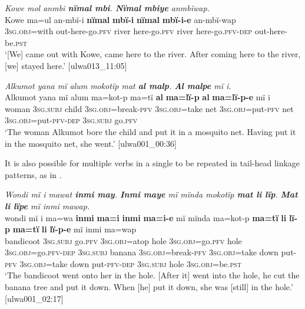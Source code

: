 \ea%
\label{ex:complex:69}
\textit{Kowe mol anmbi \textbf{nïmal mbi}. \textbf{Nïmal mbiye} anmbïwap.}\\
\gll    Kowe  ma=ul      an-mbï-i      \textbf{nïmal}  \textbf{mbï-i}      \textbf{nïmal}     \textbf{mbï-i-e}      an-mbï-wap\\
    [name]  3\textsc{sg.obj}=with  out-here-go.\textsc{pfv}  river  here-go.\textsc{pfv}  river    here-go.\textsc{pfv-dep}  out-here-be.\textsc{pst}\\
\glt `[We] came out with Kowe, came here to the river. After coming here to the river, [we] stayed here.’ [ulwa013\_11:05]
\z

\newpage

\ea%
    \label{ex:complex:70}
          \textit{Alkumot yana mï alum mokotïp mat \textbf{al malp}. \textbf{Al malpe} mï i.}\\
\gll    Alkumot  yana    mï      alum  ma=kot-p     ma=tï      \textbf{al}  \textbf{ma=lï{}-p}      \textbf{al}  \textbf{ma=lï{}-p-e}   mï      i\\
    [name]    woman    \textsc{3sg.subj}  child  3\textsc{sg.obj}=break-\textsc{pfv}    3\textsc{sg.obj=}take  net  3\textsc{sg.obj}=put-\textsc{pfv}  net  \textsc{3sg.obj=}put\textsc{{}-pfv-dep}  \textsc{3sg.subj}  go.\textsc{pfv}\\
\glt `The woman Alkumot bore the child and put it in a mosquito net. Having put it in the mosquito net, she went.’ [ulwa001\_00:36]
\z

It is also possible for multiple verbs in a single  to be repeated in tail-head linkage patterns, as in .

\ea%
    \label{ex:complex:71}
          \textit{Wondi mï i mawat \textbf{inmi may}. \textbf{Inmi maye} mï mïnda mokotïp \textbf{mat li lïp}. \textbf{Mat li lïpe} mï inmi mawap.}\\
\gll    wondi    mï      i    ma=wa    \textbf{inmi}  \textbf{ma=i}     \textbf{inmi}  \textbf{ma=i-e}        mï      mïnda     ma=kot-p        \textbf{ma=tï}      \textbf{li}    \textbf{lï-p}      \textbf{ma=tï}     \textbf{li}    \textbf{lï-p-e}      mï      inmi  ma=wap\\
    bandicoot  \textsc{3sg.subj}  go.\textsc{pfv}  3\textsc{sg.obj}=atop  hole  \textsc{3sg.obj}=go.\textsc{pfv}    hole  3\textsc{sg.obj}=go.\textsc{pfv-dep}  3\textsc{sg.subj}  banana    \textsc{3sg.obj}=break-\textsc{pfv}  \textsc{3sg.obj=}take  down  put\textsc{{}-pfv}  \textsc{3sg.obj=}take    down  put-\textsc{pfv-dep}  \textsc{3sg.subj}  hole  3\textsc{sg.obj}=be.\textsc{pst}\\
\glt `The bandicoot went onto her in the hole. [After it] went into the hole, he cut the banana tree and put it down. When [he] put it down, she was [still] in the hole.’ [ulwa001\_02:17]
\z

